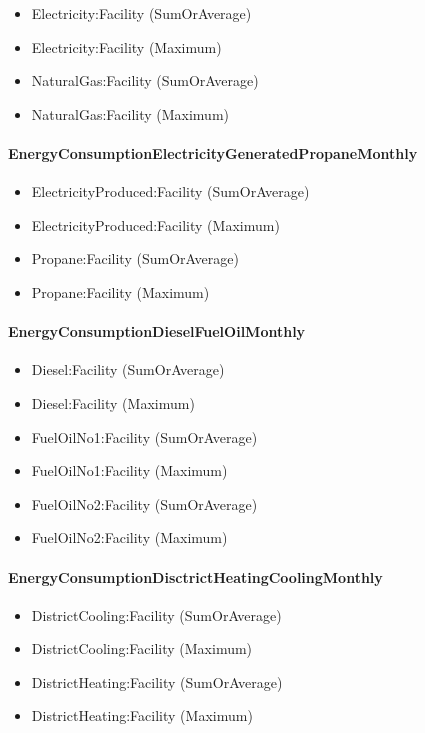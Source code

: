 \begin{itemize}
\item
  Electricity:Facility (SumOrAverage)
\item
  Electricity:Facility (Maximum)
\item
  NaturalGas:Facility (SumOrAverage)
\item
  NaturalGas:Facility (Maximum)
\end{itemize}

\paragraph{EnergyConsumptionElectricityGeneratedPropaneMonthly}\label{energyconsumptionelectricitygeneratedpropanemonthly}

\begin{itemize}
\item
  ElectricityProduced:Facility (SumOrAverage)
\item
  ElectricityProduced:Facility (Maximum)
\item
  Propane:Facility (SumOrAverage)
\item
  Propane:Facility (Maximum)
\end{itemize}

\paragraph{EnergyConsumptionDieselFuelOilMonthly}\label{energyconsumptiondieselfuel-oilmonthly}

\begin{itemize}
\item
  Diesel:Facility (SumOrAverage)
\item
  Diesel:Facility (Maximum)
\item
  FuelOilNo1:Facility (SumOrAverage)
\item
  FuelOilNo1:Facility (Maximum)
\item
  FuelOilNo2:Facility (SumOrAverage)
\item
  FuelOilNo2:Facility (Maximum)
\end{itemize}

\paragraph{EnergyConsumptionDisctrictHeatingCoolingMonthly}\label{energyconsumptiondisctrictheatingcoolingmonthly}

\begin{itemize}
\item
  DistrictCooling:Facility (SumOrAverage)
\item
  DistrictCooling:Facility (Maximum)
\item
  DistrictHeating:Facility (SumOrAverage)
\item
  DistrictHeating:Facility (Maximum)
\end{itemize}


